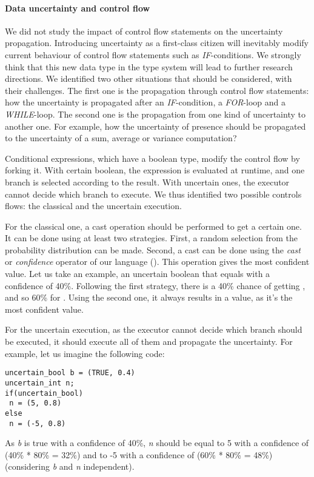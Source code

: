 \paragraph{Data uncertainty and control flow}
We did not study the impact of control flow statements on the uncertainty propagation.
Introducing uncertainty as a first-class citizen will inevitably modify current behaviour of control flow statements such as \textit{IF}-conditions.
We strongly think that this new data type in the type system will lead to further research directions.
We identified two other situations that should be considered, with their challenges.
The first one is the propagation through control flow statements: how the uncertainty is propagated after an \textit{IF}-condition, a \textit{FOR}-loop and a \textit{WHILE}-loop.
The second one is the propagation from one kind of uncertainty to another one.
For example, how the uncertainty of presence should be propagated to the uncertainty of a sum, average or variance computation?

Conditional expressions, which have a boolean type, modify the control flow by forking it.
With certain boolean, the expression is evaluated at runtime, and one branch is selected according to the result.
With uncertain ones, the executor cannot decide which branch to execute.
We thus identified two possible controls flows: the classical and the uncertain execution.

For the classical one, a cast operation should be performed to get a certain one.
It can be done using at least two strategies.
First, a random selection from the probability distribution can be made.
Second, a cast can be done using the \textit{cast} or \textit{confidence} operator of our language (\cf {}).
This operation gives the most confident value.
Let us take an example, an uncertain boolean that equals \false{} with a confidence of 40\%.
Following the first strategy, there is a 40\% chance of getting \false{}, and so 60\% for	 \true{}.
Using the second one, it always results in a \true{} value, as it's the most confident value.

For the uncertain execution, as the executor cannot decide which branch should be executed, it should execute all of them and propagate the uncertainty.
For example, let us imagine the following code:

\begin{lstlisting}[style=javaStyle, caption=Example for uncertain control flow]
uncertain_bool b = (TRUE, 0.4)
uncertain_int n;
if(uncertain_bool)
 n = (5, 0.8)
else
 n = (-5, 0.8)
\end{lstlisting}
As \textit{b} is true with a confidence of 40\%, \textit{n} should be equal to 5 with a confidence of (40\% * 80\% = 32\%) and to -5 with a confidence of (60\% * 80\% = 48\%) (considering \textit{b} and \textit{n} independent).

